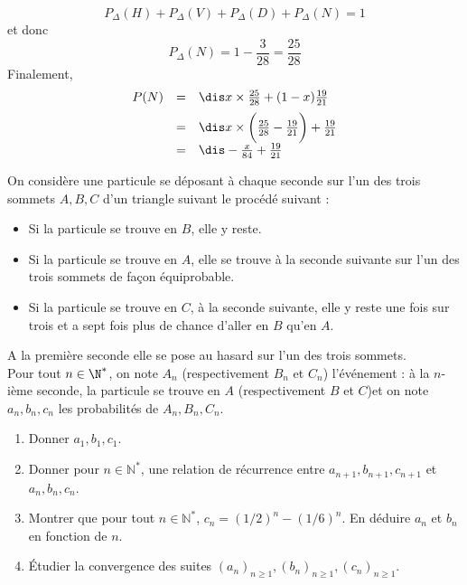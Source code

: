 \documentclass[a4paper,10pt]{report}
\begin{document}
\begin{enumerate}
\begin{enumerate}
\[ P_{\Delta}(H) + P_{\Delta}(V) + P_{\Delta}(D) + P_{\Delta}(N) = 1 \]
et donc 
\[ P_{\Delta}(N) = 1 - \frac{3}{28} = \frac{25}{28} \]
Finalement,
\[ \begin{array}{ccl}
P(N) & = & \dis x \times \frac{25}{28}+ (1-x) \frac{19}{21} \\[0.2cm]
& = & \dis x \times \bigg{(} \frac{25}{28} - \frac{19}{21} \bigg{)} + \frac{19}{21} \\[0.2cm]
& = & \dis - \frac{x}{84} + \frac{19}{21} \\
\end{array}\]
\end{enumerate}
\end{enumerate}



\begin{Exa} On considère une particule se déposant à chaque seconde sur l'un des trois sommets $A,B,C$ d'un triangle suivant le procédé suivant :

\vspace{0.3cm}

\begin{itemize}
 \item Si la particule se trouve en $B$, elle y reste.
 \item Si la particule se trouve en $A$, elle se trouve à la seconde suivante sur l'un des trois sommets de façon équiprobable.
 \item Si la particule se trouve en $C$, à la seconde suivante, elle y reste une fois sur trois et a sept fois plus de chance d'aller en $B$ qu'en $A$.
\end{itemize}

\vspace{0.3cm}

\noindent A la première seconde elle se pose au hasard sur l'un des trois sommets.\\
Pour tout $n\in \N^*$, on note $A_n$ (respectivement $B_n$ et $C_n$) l'événement : \og à la $n$-ième seconde, la particule se trouve en $A$ (respectivement $B$ et $C$)\fg et on note $a_n, b_n, c_n$ les probabilités de $A_n, B_n, C_n$.

\vspace{0.3cm}

\begin{enumerate}
 \item Donner $a_1, b_1, c_1$.
 \item Donner pour $n \in \mathbb{N}^*$, une relation de récurrence entre $a_{n+1}, b_{n+1}, c_{n+1}$ et $a_n, b_n, c_n$.
 \item Montrer que pour tout $n \in \mathbb{N}^*$, $c_n = (1/2)^n-(1/6)^n$. En déduire $a_n$ et $b_n$ en fonction de $n$.
 \item Étudier la convergence des suites $(a_n)_{n \geq 1}, (b_n)_{n \geq 1}, (c_n)_{n \geq 1}$.
\end{enumerate}
\end{Exa}
\end{document}
